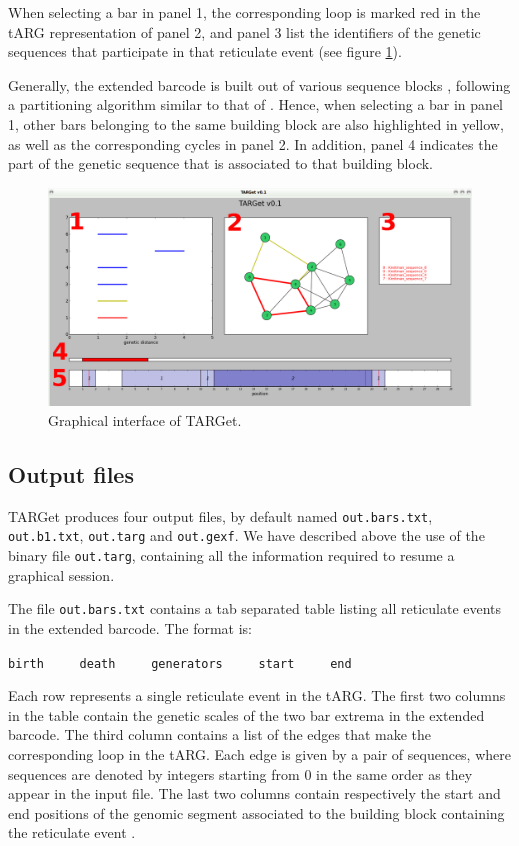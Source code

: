 \documentclass[12pt]{article}
\begin{document}
When selecting a bar in panel 1, the corresponding loop is marked red in the tARG representation of panel 2, and panel 3 list the identifiers of the genetic sequences that participate in that reticulate event (see figure \ref{fig2}). 

Generally, the extended barcode is built out of various sequence blocks \cite{target}, following a partitioning algorithm similar to that of \cite{mg}. Hence, when selecting a bar in panel 1, other bars belonging to the same building block are also highlighted in yellow, as well as the corresponding cycles in panel 2. In addition, panel 4 indicates the part of the genetic sequence that is associated to that building block.

\begin{figure}[!ht]
\centering
\includegraphics[width=15.cm, angle=0]{Screenshot.png}
\caption{Graphical interface of TARGet.
\label{fig2}}
\end{figure} 


\subsection*{Output files}

TARGet produces four output files, by default named \texttt{out.bars.txt}, \texttt{out.b1.txt}, \texttt{out.targ} and \texttt{out.gexf}. We have described above the use of the binary file \texttt{out.targ}, containing all the information required to resume a graphical session.

The file \texttt{out.bars.txt} contains a tab separated table listing all reticulate events in the extended barcode. The format is:

\texttt{birth\ \ \ \ \ death\ \ \ \ \ generators\ \ \ \ \ start\ \ \ \ \ end}

\noindent Each row represents a single reticulate event in the tARG. The first two columns in the table contain the genetic scales of the two bar extrema in the extended barcode. The third column contains a list of the edges that make the corresponding loop in the tARG. Each edge is given by a pair of sequences, where sequences are denoted by integers starting from 0 in the same order as they appear in the input file. The last two columns contain respectively the start and end positions of the genomic segment associated to the building block containing the reticulate event \cite{target}. 
\end{document}
